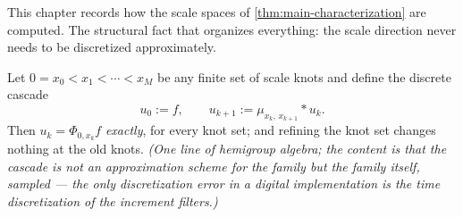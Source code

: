 %
%
%
%

This chapter records how the scale spaces of \ref{thm:main-characterization} are computed.
The structural fact that organizes everything: the scale direction never needs to be
discretized approximately.

\begin{proposition}\label{prop:knot-exactness}
Let $0 = x_0 < x_1 < \cdots < x_M$ be any finite set of scale knots and define the discrete
cascade
\[
  u_0 := f, \qquad u_{k+1} := \mu_{x_k,\,x_{k+1}} * u_k .
\]
Then $u_k = \Phi_{0, x_k} f$ \emph{exactly}, for every knot set; and refining the knot set
changes nothing at the old knots.
\statusT\quad\emph{(One line of hemigroup algebra; the content is that the cascade is not an
approximation scheme for the family but the family itself, sampled --- the only
discretization error in a digital implementation is the time discretization of the
increment filters.)}
\end{proposition}

